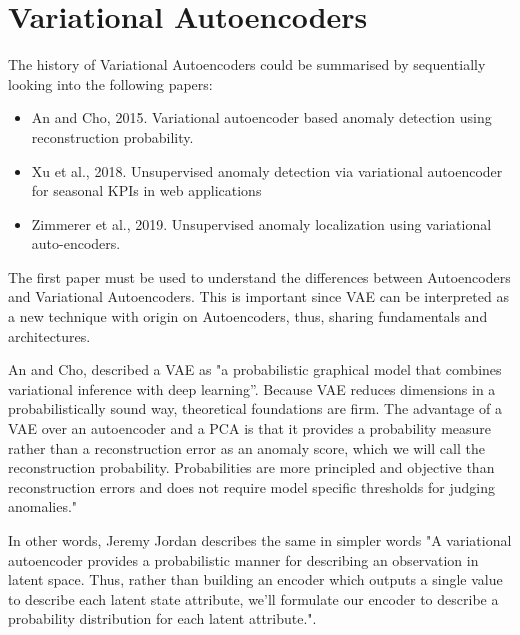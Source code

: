 \section*{Variational Autoencoders}

The history of Variational Autoencoders could be summarised by sequentially looking into the following papers:

\begin{itemize}
    \item An and Cho, 2015. Variational autoencoder based anomaly detection using reconstruction probability.
    \item Xu et al., 2018. Unsupervised anomaly detection via variational autoencoder for seasonal KPIs in web applications
    \item Zimmerer et al., 2019. Unsupervised anomaly localization using variational auto-encoders.
\end{itemize}

The first paper must be used to understand the differences between Autoencoders and Variational Autoencoders. This is important since VAE can be interpreted as a new technique with origin on Autoencoders, thus, sharing fundamentals and architectures.

An and Cho, described a VAE as "a probabilistic graphical model that combines variational inference with deep learning”. Because VAE reduces dimensions in a probabilistically sound way, theoretical foundations are firm. The advantage of a VAE over an autoencoder and a PCA is that it provides a probability measure rather than a reconstruction error as an anomaly score, which we will call the reconstruction probability. Probabilities are more principled and objective than reconstruction errors and does not require model specific thresholds for judging anomalies."

In other words, Jeremy Jordan describes the same in simpler words "A variational autoencoder provides a probabilistic manner for describing an observation in latent space. Thus, rather than building an encoder which outputs a single value to describe each latent state attribute, we'll formulate our encoder to describe a probability distribution for each latent attribute.".


